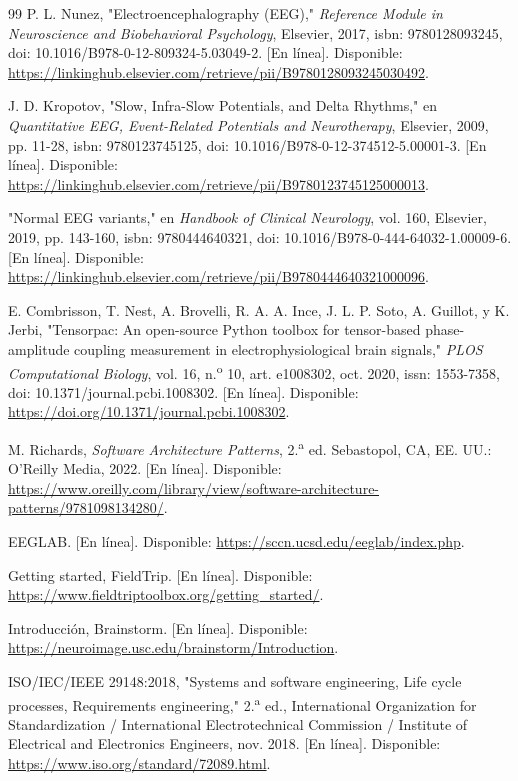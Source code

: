 \documentclass[12pt,letterpaper,oneside]{article}
\begin{document}
\begin{thebibliography}{99}
 P. L. Nunez, "Electroencephalography (EEG)," \textit{Reference Module in Neuroscience and Biobehavioral Psychology}, Elsevier, 2017, isbn: 9780128093245, doi: 10.1016/B978-0-12-809324-5.03049-2. [En línea]. Disponible: \url{https://linkinghub.elsevier.com/retrieve/pii/B9780128093245030492}.

 J. D. Kropotov, "Slow, Infra-Slow Potentials, and Delta Rhythms," en \textit{Quantitative EEG, Event-Related Potentials and Neurotherapy}, Elsevier, 2009, pp. 11-28, isbn: 9780123745125, doi: 10.1016/B978-0-12-374512-5.00001-3. [En línea]. Disponible: \url{https://linkinghub.elsevier.com/retrieve/pii/B9780123745125000013}.

 "Normal EEG variants," en \textit{Handbook of Clinical Neurology}, vol. 160, Elsevier, 2019, pp. 143-160, isbn: 9780444640321, doi: 10.1016/B978-0-444-64032-1.00009-6. [En línea]. Disponible: \url{https://linkinghub.elsevier.com/retrieve/pii/B9780444640321000096}.

 E. Combrisson, T. Nest, A. Brovelli, R. A. A. Ince, J. L. P. Soto, A. Guillot, y K. Jerbi, "Tensorpac: An open-source Python toolbox for tensor-based phase-amplitude coupling measurement in electrophysiological brain signals," \textit{PLOS Computational Biology}, vol. 16, n.\textsuperscript{o} 10, art. e1008302, oct. 2020, issn: 1553-7358, doi: 10.1371/journal.pcbi.1008302. [En línea]. Disponible: \url{https://doi.org/10.1371/journal.pcbi.1008302}.

 M. Richards, \textit{Software Architecture Patterns}, 2.\textsuperscript{a} ed. Sebastopol, CA, EE. UU.: O'Reilly Media, 2022. [En línea]. Disponible: \url{https://www.oreilly.com/library/view/software-architecture-patterns/9781098134280/}.

 EEGLAB. [En línea]. Disponible: \url{https://sccn.ucsd.edu/eeglab/index.php}.

 Getting started, FieldTrip. [En línea]. Disponible: \url{https://www.fieldtriptoolbox.org/getting_started/}.

 Introducción, Brainstorm. [En línea]. Disponible: \url{https://neuroimage.usc.edu/brainstorm/Introduction}.

 ISO/IEC/IEEE 29148:2018, "Systems and software engineering, Life cycle processes, Requirements engineering," 2.\textsuperscript{a} ed., International Organization for Standardization / International Electrotechnical Commission / Institute of Electrical and Electronics Engineers, nov. 2018. [En línea]. Disponible: \url{https://www.iso.org/standard/72089.html}.


\end{thebibliography}
\end{document}
